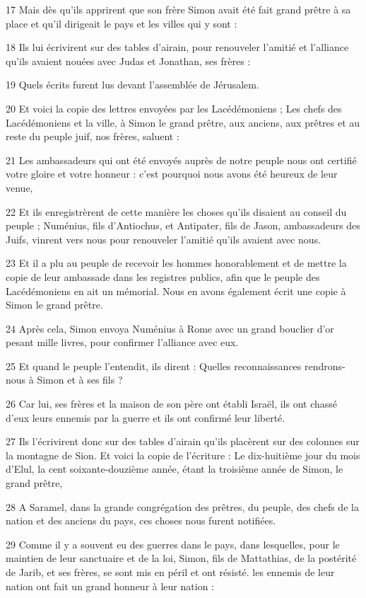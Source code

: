 \par 17 Mais dès qu'ils apprirent que son frère Simon avait été fait grand prêtre à sa place et qu'il dirigeait le pays et les villes qui y sont :
\par 18 Ils lui écrivirent sur des tables d'airain, pour renouveler l'amitié et l'alliance qu'ils avaient nouées avec Judas et Jonathan, ses frères :
\par 19 Quels écrits furent lus devant l'assemblée de Jérusalem.
\par 20 Et voici la copie des lettres envoyées par les Lacédémoniens ; Les chefs des Lacédémoniens et la ville, à Simon le grand prêtre, aux anciens, aux prêtres et au reste du peuple juif, nos frères, saluent :
\par 21 Les ambassadeurs qui ont été envoyés auprès de notre peuple nous ont certifié votre gloire et votre honneur : c'est pourquoi nous avons été heureux de leur venue,
\par 22 Et ils enregistrèrent de cette manière les choses qu'ils disaient au conseil du peuple ; Numénius, fils d'Antiochus, et Antipater, fils de Jason, ambassadeurs des Juifs, vinrent vers nous pour renouveler l'amitié qu'ils avaient avec nous.
\par 23 Et il a plu au peuple de recevoir les hommes honorablement et de mettre la copie de leur ambassade dans les registres publics, afin que le peuple des Lacédémoniens en ait un mémorial. Nous en avons également écrit une copie à Simon le grand prêtre.
\par 24 Après cela, Simon envoya Numénius à Rome avec un grand bouclier d'or pesant mille livres, pour confirmer l'alliance avec eux.
\par 25 Et quand le peuple l'entendit, ils dirent : Quelles reconnaissances rendrons-nous à Simon et à ses fils ?
\par 26 Car lui, ses frères et la maison de son père ont établi Israël, ils ont chassé d'eux leurs ennemis par la guerre et ils ont confirmé leur liberté.
\par 27 Ils l'écrivirent donc sur des tables d'airain qu'ils placèrent sur des colonnes sur la montagne de Sion. Et voici la copie de l'écriture : Le dix-huitième jour du mois d'Elul, la cent soixante-douzième année, étant la troisième année de Simon, le grand prêtre,
\par 28 A Saramel, dans la grande congrégation des prêtres, du peuple, des chefs de la nation et des anciens du pays, ces choses nous furent notifiées.
\par 29 Comme il y a souvent eu des guerres dans le pays, dans lesquelles, pour le maintien de leur sanctuaire et de la loi, Simon, fils de Mattathias, de la postérité de Jarib, et ses frères, se sont mis en péril et ont résisté. les ennemis de leur nation ont fait un grand honneur à leur nation :
